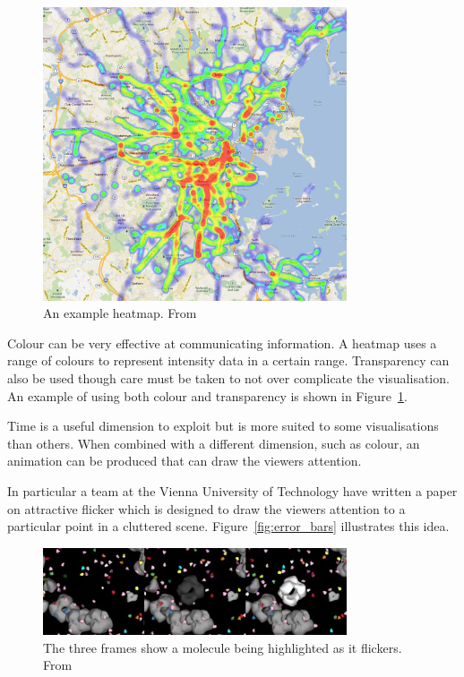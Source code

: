 \begin{figure}[h]
    \centering
	\includegraphics[width=0.8\textwidth]{images/heatmap.png}
    \caption{An example heatmap. From \cite{heatmap}}
    \label{fig:heatmap}
\end{figure}

Colour can be very effective at communicating information. A heatmap uses a range of colours to represent intensity data in a certain range. Transparency can also be used though care must be taken to not over complicate the visualisation. An example of using both colour and transparency is shown in Figure~\ref{fig:heatmap}.

Time is a useful dimension to exploit but is more suited to some visualisations than others. When combined with a different dimension, such as colour, an animation can be produced that can draw the viewers attention.

In particular a team at the Vienna University of Technology have written a paper on attractive flicker which is designed to draw the viewers attention to a particular point in a cluttered scene\cite{attractiveflicker}. Figure~\ref{fig:error_bars} illustrates this idea.

\begin{figure}[h]
    \centering
	\includegraphics[width=0.8\textwidth]{images/flicker.png}
    \caption{The three frames show a molecule being highlighted as it flickers. From \cite{attractiveflicker}}
    \label{fig:flicker}
\end{figure}

